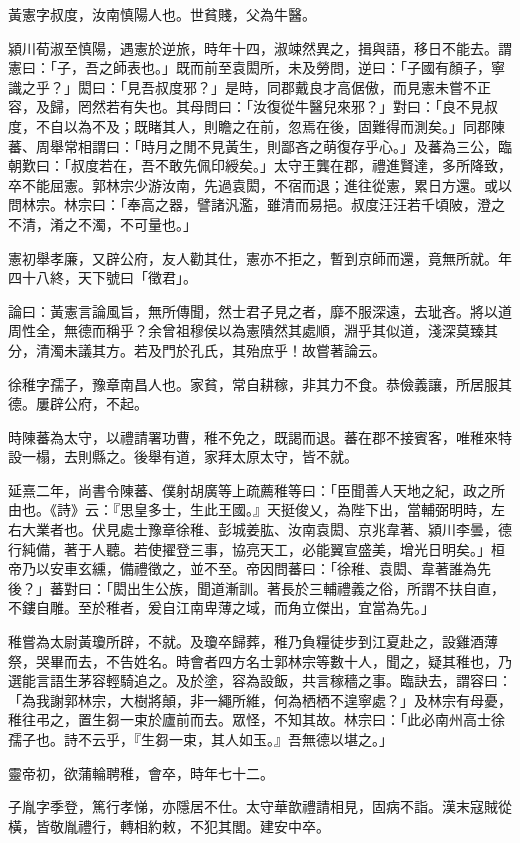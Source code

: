 \begin{pinyinscope}
黃憲字叔度，汝南慎陽人也。世貧賤，父為牛醫。

潁川荀淑至慎陽，遇憲於逆旅，時年十四，淑竦然異之，揖與語，移日不能去。謂憲曰：「子，吾之師表也。」既而前至袁閎所，未及勞問，逆曰：「子國有顏子，寧識之乎？」閎曰：「見吾叔度邪？」是時，同郡戴良才高倨傲，而見憲未嘗不正容，及歸，罔然若有失也。其母問曰：「汝復從牛醫兒來邪？」對曰：「良不見叔度，不自以為不及；既睹其人，則瞻之在前，忽焉在後，固難得而測矣。」同郡陳蕃、周舉常相謂曰：「時月之閒不見黃生，則鄙吝之萌復存乎心。」及蕃為三公，臨朝歎曰：「叔度若在，吾不敢先佩印綬矣。」太守王龔在郡，禮進賢達，多所降致，卒不能屈憲。郭林宗少游汝南，先過袁閎，不宿而退；進往從憲，累日方還。或以問林宗。林宗曰：「奉高之器，譬諸汎濫，雖清而易挹。叔度汪汪若千頃陂，澄之不清，淆之不濁，不可量也。」

憲初舉孝廉，又辟公府，友人勸其仕，憲亦不拒之，暫到京師而還，竟無所就。年四十八終，天下號曰「徵君」。

論曰：黃憲言論風旨，無所傳聞，然士君子見之者，靡不服深遠，去玼吝。將以道周性全，無德而稱乎？余曾祖穆侯以為憲隤然其處順，淵乎其似道，淺深莫臻其分，清濁未議其方。若及門於孔氏，其殆庶乎！故嘗著論云。

徐稚字孺子，豫章南昌人也。家貧，常自耕稼，非其力不食。恭儉義讓，所居服其德。屢辟公府，不起。

時陳蕃為太守，以禮請署功曹，稚不免之，既謁而退。蕃在郡不接賓客，唯稚來特設一榻，去則縣之。後舉有道，家拜太原太守，皆不就。

延熹二年，尚書令陳蕃、僕射胡廣等上疏薦稚等曰：「臣聞善人天地之紀，政之所由也。《詩》云：『思皇多士，生此王國。』天挺俊乂，為陛下出，當輔弼明時，左右大業者也。伏見處士豫章徐稚、彭城姜肱、汝南袁閎、京兆韋著、潁川李曇，德行純備，著于人聽。若使擢登三事，協亮天工，必能翼宣盛美，增光日明矣。」桓帝乃以安車玄纁，備禮徵之，並不至。帝因問蕃曰：「徐稚、袁閎、韋著誰為先後？」蕃對曰：「閎出生公族，聞道漸訓。著長於三輔禮義之俗，所謂不扶自直，不鏤自雕。至於稚者，爰自江南卑薄之域，而角立傑出，宜當為先。」

稚嘗為太尉黃瓊所辟，不就。及瓊卒歸葬，稚乃負糧徒步到江夏赴之，設雞酒薄祭，哭畢而去，不告姓名。時會者四方名士郭林宗等數十人，聞之，疑其稚也，乃選能言語生茅容輕騎追之。及於塗，容為設飯，共言稼穡之事。臨訣去，謂容曰：「為我謝郭林宗，大樹將顛，非一繩所維，何為栖栖不遑寧處？」及林宗有母憂，稚往弔之，置生芻一束於廬前而去。眾怪，不知其故。林宗曰：「此必南州高士徐孺子也。詩不云乎，『生芻一束，其人如玉。』吾無德以堪之。」

靈帝初，欲蒲輪聘稚，會卒，時年七十二。

子胤字季登，篤行孝悌，亦隱居不仕。太守華歆禮請相見，固病不詣。漢末寇賊從橫，皆敬胤禮行，轉相約敕，不犯其閭。建安中卒。


\end{pinyinscope}
